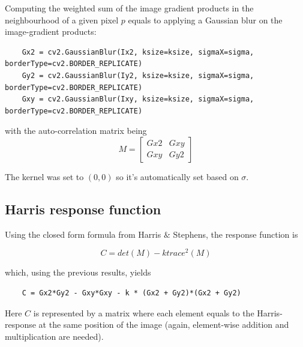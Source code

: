 \documentclass[10pt,a4paper,twoside]{article}
\begin{document}
Computing the weighted sum of the image gradient products in the neighbourhood of a
given pixel $p$ equals to applying a Gaussian blur on the image-gradient products:
\begin{verbatim}
    Gx2 = cv2.GaussianBlur(Ix2, ksize=ksize, sigmaX=sigma, borderType=cv2.BORDER_REPLICATE)
    Gy2 = cv2.GaussianBlur(Iy2, ksize=ksize, sigmaX=sigma, borderType=cv2.BORDER_REPLICATE)
    Gxy = cv2.GaussianBlur(Ixy, ksize=ksize, sigmaX=sigma, borderType=cv2.BORDER_REPLICATE)
\end{verbatim}

with the auto-correlation matrix being
\[M = \begin{bmatrix}
    Gx2 & Gxy\\ 
    Gxy & Gy2
  \end{bmatrix}\]

The kernel was set to $(0,0)$ so it's automatically set based on $\sigma$. 


\subsection{Harris response function}

Using the closed form formula from Harris $\&$ Stephens, the response function is 

\[C = det(M) - k trace^2(M)\]

which, using the previous results, yields

\begin{verbatim}
    C = Gx2*Gy2 - Gxy*Gxy - k * (Gx2 + Gy2)*(Gx2 + Gy2)
\end{verbatim}
Here $C$ is represented by a matrix where each element equals to the Harris-response
at the same position of the image (again, element-wise addition and
multiplication are needed).


\end{document}
